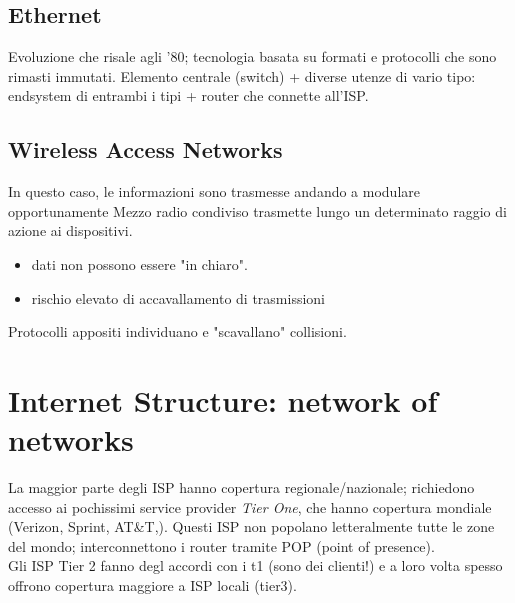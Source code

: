 	\subsection{Ethernet}
	Evoluzione che risale agli '80; tecnologia basata su formati e protocolli che sono rimasti immutati.
	Elemento centrale (switch) + diverse utenze di vario tipo: endsystem di entrambi i tipi + router che connette all'ISP.
	\subsection{Wireless Access Networks}
	In questo caso, le informazioni sono trasmesse andando a modulare opportunamente %
	Mezzo radio condiviso trasmette lungo un determinato raggio di azione ai dispositivi.
	\begin{itemize}
		\item dati non possono essere "in chiaro".
		\item rischio elevato di accavallamento di trasmissioni
	\end{itemize}
	Protocolli appositi individuano e "scavallano" collisioni.
	
	
	\section{Internet Structure: network of networks}
	La maggior parte degli ISP hanno copertura regionale/nazionale; richiedono accesso ai pochissimi service provider \textit{Tier One}, che hanno copertura mondiale (Verizon, Sprint, AT\&T,). Questi ISP non popolano letteralmente tutte le zone del mondo; interconnettono i router tramite POP (point of presence).\\ 
	
	Gli ISP Tier 2 fanno degl accordi con i t1 (sono dei clienti!) e a loro volta spesso offrono copertura maggiore a ISP locali (tier3).